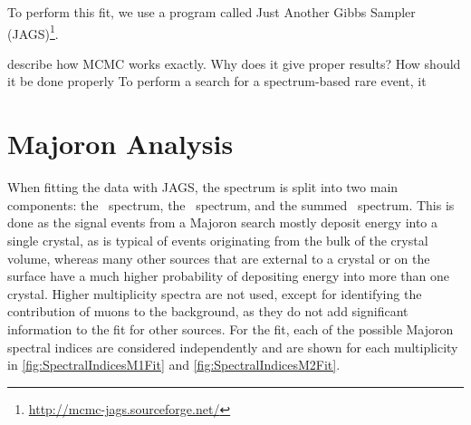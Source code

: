 To perform this fit, we use a program called Just Another Gibbs Sampler (JAGS)\footnote{\RaggedRight\url{http://mcmc-jags.sourceforge.net/}}.

describe how MCMC works exactly. Why does it give proper results? How should it be done properly
To perform a search for a spectrum-based rare event, it 

\section{Majoron Analysis}
When fitting the data with JAGS, the spectrum is split into two main components: the \Mone~spectrum, the \Mtwo~spectrum, and the summed \Msum~spectrum. This is done as the signal events from a Majoron search mostly deposit energy into a single crystal, as is typical of events originating from the bulk of the crystal volume, whereas many other sources that are external to a crystal or on the surface have a much higher probability of depositing energy into more than one crystal. Higher multiplicity spectra are not used, except for identifying the contribution of muons to the background, as they do not add significant information to the fit for other sources. For the fit, each of the possible Majoron spectral indices are considered independently and are shown for each multiplicity in \autoref{fig:SpectralIndicesM1Fit} and \autoref{fig:SpectralIndicesM2Fit}.



